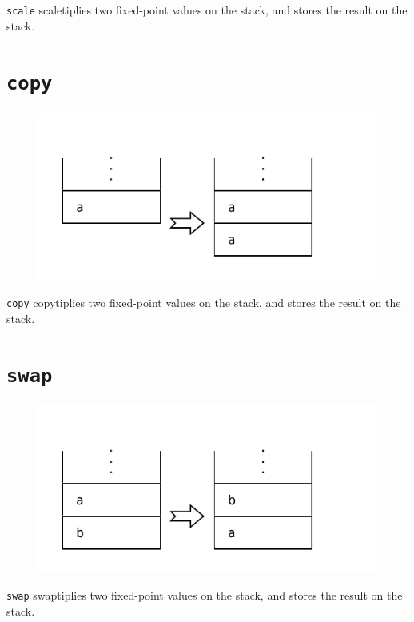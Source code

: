 		\texttt{scale} scaletiplies two fixed-point values on the stack, and stores
		the result on the stack.

\section*{\texttt{copy}}

	\begin{figure}
		\begin{flushright}
			\includegraphics[width=0.9\linewidth]{figure/pdf/i_copy} 
		\end{flushright}
	\end{figure}

		\texttt{copy} copytiplies two fixed-point values on the stack, and stores
		the result on the stack.

\section*{\texttt{swap}}

	\begin{figure}
		\begin{flushright}
			\includegraphics[width=0.9\linewidth]{figure/pdf/i_swap} 
		\end{flushright}
	\end{figure}

		\texttt{swap} swaptiplies two fixed-point values on the stack, and stores
		the result on the stack.
